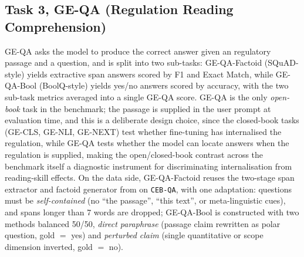 \documentclass[pdflatex, sn-apa]{sn-jnl}%
\theoremstyle{thmstyleone}%
\theoremstyle{thmstyletwo}%
\theoremstyle{thmstylethree}%
\begin{document}
\subsection{Task 3, GE-QA (Regulation Reading Comprehension)}
\label{sec:bench:qa}
GE-QA asks the model to produce the correct answer given an regulatory passage
and a question, and is split into two sub-tasks: GE-QA-Factoid (SQuAD-style)
yields extractive span answers scored by F1 and Exact Match, while GE-QA-Bool
(BoolQ-style) yields yes/no answers scored by accuracy, with the two sub-task
metrics averaged into a single GE-QA score. GE-QA is the only \emph{open-book}
task in the benchmark; the passage is supplied in the user prompt at evaluation
time, and this is a deliberate design choice, since the closed-book tasks
(GE-CLS, GE-NLI, GE-NEXT) test whether fine-tuning has internalised the
regulation, while GE-QA tests whether the model can locate answers when the
regulation is supplied, making the open/closed-book contrast across the
benchmark itself a diagnostic instrument for discriminating internalisation from
reading-skill effects. On the data side, GE-QA-Factoid reuses the two-stage span
extractor and factoid generator from  on
\texttt{CEB-QA}, with one adaptation: questions must be \emph{self-contained}
(no ``the passage'', ``this text'', or meta-linguistic cues), and spans longer
than 7 words are dropped; GE-QA-Bool is constructed with two methods balanced
50/50, \emph{direct paraphrase} (passage claim rewritten as polar question, gold
$=$ yes) and \emph{perturbed claim} (single quantitative or scope dimension
inverted, gold $=$ no).



\end{document}
